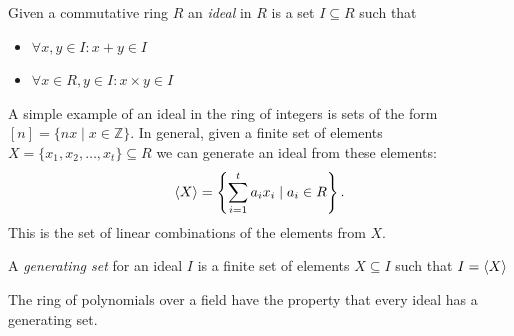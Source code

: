 \documentclass{article}
\theoremstyle{changedot}
\theoremstyle{changedotbreak}
\theoremstyle{nonumberplain}
\DeclarePairedDelimiter{\tuple}{\langle}{\rangle}
\newcommand{\m}{\mathbb}
\begin{document}
\begin{definition}[Ideal]
  Given a commutative ring $R$ an \emph{ideal} in $R$ is a set $I \subseteq R$ such that
  \begin{itemize}
      \item $\forall x, y \in I: x + y \in I$
      \item $\forall x \in R, y \in I: x \times y \in I$
  \end{itemize}
\end{definition}

A simple example of an ideal in the ring of integers is sets of the form $[n] = \{nx \mid x \in \m Z\}$. In general, given a finite set of elements $X = \{x_{1}, x_{2}, \dots, x_{t}\} \subseteq R$ we can generate an ideal from these elements: \[\tuple X = \left\{\sum_{i = 1}^{t} a_{i} x_{i} \mid a_{i} \in R\right\}.\] This is the set of linear combinations of the elements from $X$.

\begin{definition}
  A \emph{generating set} for an ideal $I$ is a finite set of elements $X \subseteq I$ such that $I = \tuple X$
\end{definition}

The ring of polynomials over a field have the property that every ideal has a generating set.
\end{document}
